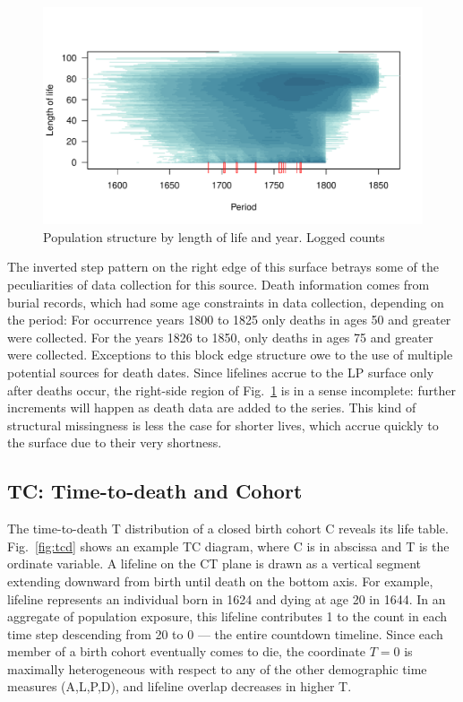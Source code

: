 \documentclass{bmcart}
\begin{document}
\begin{figure}
\centering
\includegraphics[scale=.9]{Figures/QuebecLP.pdf}
\caption{Population structure by length of life and year. Logged counts}
\label{fig:lpq}
\end{figure}

The inverted step pattern on the right edge of this surface betrays some of the peculiarities of data collection for this source. Death information comes from burial records, which had some age constraints in data collection, depending on the period: For occurrence years 1800 to 1825 only deaths in ages 50 and greater were collected. For the years 1826 to 1850, only deaths in ages 75 and greater were collected. Exceptions to this block edge structure owe to the use of multiple potential sources for death dates. Since lifelines accrue to the LP surface only after deaths occur, the right-side region of Fig.~\ref{fig:lpq} is in a sense incomplete: further increments will happen as death data are added to the series. This kind of structural missingness is less the case for shorter lives, which accrue quickly to the surface due to their very shortness.

\FloatBarrier
\subsection*{TC: Time-to-death and Cohort}

The time-to-death T distribution of a closed birth cohort C reveals its life table. Fig.~\ref{fig:tcd} shows an example TC diagram, where C is in abscissa and T is the ordinate variable. A lifeline on the CT plane is drawn as a vertical segment extending downward from birth until death on the bottom axis. For example, lifeline  represents an individual born in 1624 and dying at age 20 in 1644. In an aggregate of population exposure, this lifeline contributes 1 to the count in each time step descending from 20 to 0 --- the entire countdown timeline. Since each member of a birth cohort eventually comes to die, the coordinate $T = 0$ is maximally heterogeneous with respect to any of the other demographic time measures (A,L,P,D), and lifeline overlap decreases in higher T.
\end{document}
